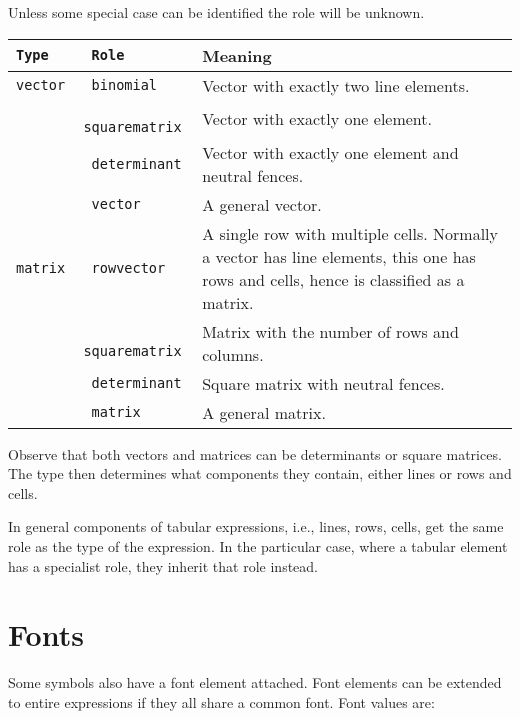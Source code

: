 \documentclass{article}
\begin{document}
Unless some special case can be identified the role will be unknown.

\begin{tabular}{>{\tt}l>{\tt}lp{11cm}}
  Type & Role & Meaning\\\hline
  vector & binomial & Vector with exactly two line elements.\\
       & squarematrix & Vector with exactly one element.\\
       & determinant & Vector with exactly one element and neutral fences.\\
       & vector & A general vector.\\
  matrix & rowvector & A single row with multiple cells. Normally a vector has line elements,
                       this one has rows and cells, hence is classified as a matrix.\\
       & squarematrix & Matrix with the number of rows and columns.\\
       & determinant & Square matrix with neutral fences.\\
       & matrix & A general matrix.\\
\end{tabular}
Observe that both vectors and matrices can be determinants or square
matrices. The type then determines what components they contain, either lines or
rows and cells.

In general components of tabular expressions, i.e., lines, rows, cells, get the
same role as the type of the expression. In the particular case, where a tabular
element has a specialist role, they inherit that role instead.

\section{Fonts}
\label{sec:fonts}

Some symbols also have a font element attached. Font elements can be extended to
entire expressions if they all share a common font. Font values are:\vspace*{.5cm}
\end{document}
